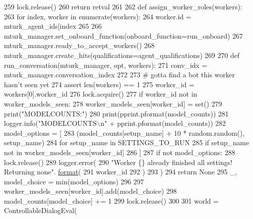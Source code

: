 \begin{DoxyCode}
{{{{259             lock.release()
260             \textcolor{keywordflow}{return} retval
261 
262         \textcolor{keyword}{def }assign\_worker\_roles(workers):
263             \textcolor{keywordflow}{for} index, worker \textcolor{keywordflow}{in} enumerate(workers):
264                 worker.id = mturk\_agent\_ids[index %
265 
266         mturk\_manager.set\_onboard\_function(onboard\_function=run\_onboard)
267         mturk\_manager.ready\_to\_accept\_workers()
268         mturk\_manager.create\_hits(qualifications=agent\_qualifications)
269 
270         \textcolor{keyword}{def }run\_conversation(mturk\_manager, opt, workers):
271             conv\_idx = mturk\_manager.conversation\_index
272 
273             \textcolor{comment}{# gotta find a bot this worker hasn't seen yet}
274             \textcolor{keyword}{assert} len(workers) == 1
275             worker\_id = workers[0].worker\_id
276             lock.acquire()
277             \textcolor{keywordflow}{if} worker\_id \textcolor{keywordflow}{not} \textcolor{keywordflow}{in} worker\_models\_seen:
278                 worker\_models\_seen[worker\_id] = set()
279             print(\textcolor{stringliteral}{"MODELCOUNTS:"})
280             print(pprint.pformat(model\_counts))
281             logger.info(\textcolor{stringliteral}{"MODELCOUNTS\(\backslash\)n"} + pprint.pformat(model\_counts))
282             model\_options = [
283                 (model\_counts[setup\_name] + 10 * random.random(), setup\_name)
284                 \textcolor{keywordflow}{for} setup\_name \textcolor{keywordflow}{in} SETTINGS\_TO\_RUN
285                 \textcolor{keywordflow}{if} setup\_name \textcolor{keywordflow}{not} \textcolor{keywordflow}{in} worker\_models\_seen[worker\_id]
286             ]
287             \textcolor{keywordflow}{if} \textcolor{keywordflow}{not} model\_options:
288                 lock.release()
289                 logger.error(
290                     \textcolor{stringliteral}{"Worker \{\} already finished all settings! Returning none"}.
      \hyperlink{namespaceparlai_1_1chat__service_1_1services_1_1messenger_1_1shared__utils_a32e2e2022b824fbaf80c747160b52a76}{format}(
291                         worker\_id
292                     )
293                 )
294                 \textcolor{keywordflow}{return} \textcolor{keywordtype}{None}
295             \_, model\_choice = min(model\_options)
296 
297             worker\_models\_seen[worker\_id].add(model\_choice)
298             model\_counts[model\_choice] += 1
299             lock.release()
300 
301             world = ControllableDialogEval(
}}}}
\end{DoxyCode}
